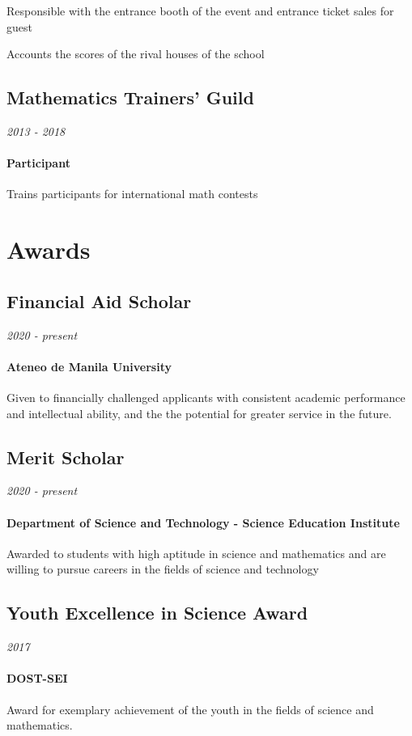 \documentclass[a4paper,10pt]{article}
\newcommand{\dates}{\hfill\textit}
\begin{document}
Responsible with the entrance booth of the event and entrance ticket sales for guest

Accounts the scores of the rival houses of the school

\subsection{Mathematics Trainers' Guild}

\dates{2013 - 2018}

\paragraph{Participant}

Trains participants for international math contests

\section{Awards}

\subsection{Financial Aid Scholar}

\dates{2020 - present}

\paragraph{Ateneo de Manila University}

Given to financially challenged applicants with consistent academic performance and intellectual ability, and the the potential for greater service in the future.


\subsection{Merit Scholar}

\dates{2020 - present}

\paragraph{Department of Science and Technology - Science Education Institute}


Awarded to students with high aptitude in science and mathematics and are willing to pursue careers in the fields of science and technology

\subsection{Youth Excellence in Science Award}

\dates{2017}

\paragraph{DOST-SEI}

Award for exemplary achievement of the youth in the fields of science and mathematics.
\end{document}

